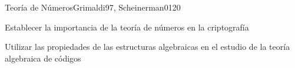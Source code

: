 \begin{sumilla}
\begin{unit}{Teor\'ia de N\'umeros}{Grimaldi97, Scheinerman01}{20}
   \begin{objetivos}
      \item Establecer la importancia de la teor\'ia de n\'umeros en la criptograf\'ia
      \item Utilizar las propiedades de las estructuras algebraicas en el estudio de la teor\'ia algebraica de c\'odigos
   \end{objetivos}
\end{unit}


\begin{bibliografia}
\end{bibliografia}

\end{sumilla}

%

